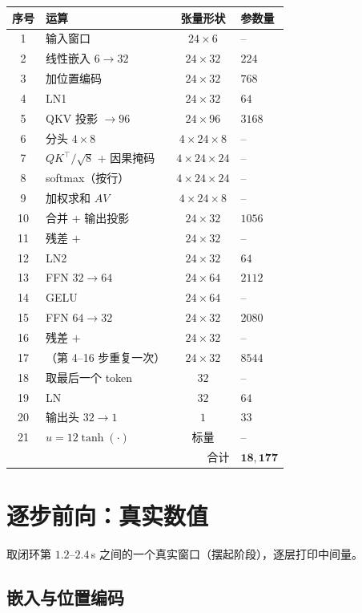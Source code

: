 \begin{center}
\small
\begin{tabular}{@{}clcl@{}}
\toprule
序号 & 运算 & 张量形状 & 参数量 \\
\midrule
1 & 输入窗口 & $24\times6$ & -- \\
2 & 线性嵌入 $6\to32$ & $24\times32$ & $224$ \\
3 & 加位置编码 & $24\times32$ & $768$ \\
\midrule
4 & LN1 & $24\times32$ & $64$ \\
5 & QKV 投影 $\to 96$ & $24\times96$ & $3168$ \\
6 & 分头 $4\times8$ & $4\times24\times8$ & -- \\
7 & $QK^\top/\sqrt8$ + 因果掩码 & $4\times24\times24$ & -- \\
8 & softmax（按行） & $4\times24\times24$ & -- \\
9 & 加权求和 $AV$ & $4\times24\times8$ & -- \\
10 & 合并 + 输出投影 & $24\times32$ & $1056$ \\
11 & 残差 $+$ & $24\times32$ & -- \\
\midrule
12 & LN2 & $24\times32$ & $64$ \\
13 & FFN $32\to64$ & $24\times64$ & $2112$ \\
14 & GELU & $24\times64$ & -- \\
15 & FFN $64\to32$ & $24\times32$ & $2080$ \\
16 & 残差 $+$ & $24\times32$ & -- \\
\midrule
17 & （第 4--16 步重复一次） & $24\times32$ & $8544$ \\
18 & 取最后一个 token & $32$ & -- \\
19 & LN & $32$ & $64$ \\
20 & 输出头 $32\to1$ & $1$ & $33$ \\
21 & $u=12\tanh(\cdot)$ & 标量 & -- \\
\midrule
\multicolumn{3}{r}{合计} & $\mathbf{18{,}177}$ \\
\bottomrule
\end{tabular}
\end{center}

\section{逐步前向：真实数值}

取闭环第 $1.2$--$2.4$\,s 之间的一个真实窗口（摆起阶段），逐层打印中间量。

\subsection{嵌入与位置编码}

